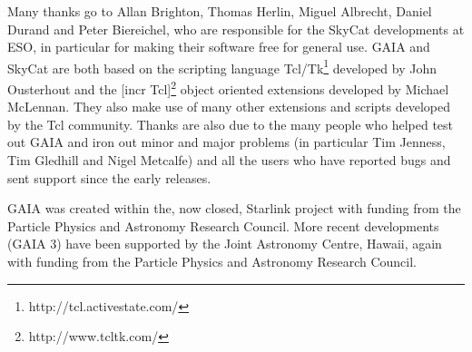 \documentclass[twoside,11pt]{article}
\newcommand{\htmladdnormallinkfoot}[2]{#1\footnote{#2}}
\newcommand{\htmladdnormallink}[2]{#1}
\renewcommand{\_}{\texttt{\symbol{95}}}
\begin{document}
Many thanks go to Allan Brighton, Thomas Herlin, Miguel Albrecht,
Daniel Durand and Peter Biereichel, who are responsible for the
\htmladdnormallink{SkyCat}{http://archive.eso.org/skycat/}
developments at ESO, in particular for making their software free for
general use.
GAIA and SkyCat are both based on the scripting language
\htmladdnormallinkfoot{Tcl/Tk}{http://tcl.activestate.com/} developed by
John Ousterhout and the \htmladdnormallinkfoot{[incr Tcl]}
{http://www.tcltk.com/} object oriented extensions developed by
Michael McLennan.
They also make use of many other extensions and scripts developed by
the Tcl community.
Thanks are also due to the many people who helped test out GAIA and
iron out minor and major problems (in particular Tim Jenness, Tim
Gledhill and Nigel Metcalfe) and all the users who have reported bugs
and sent support since the early releases.

GAIA was created within the, now closed, Starlink project with funding from
the Particle Physics and Astronomy Research Council. More recent developments
(GAIA 3) have been supported by the Joint Astronomy Centre, Hawaii, again with
funding from the Particle Physics and Astronomy Research Council.

\end{document}
